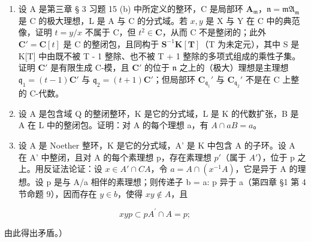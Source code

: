 \begin{enumerate}
\def\labelenumi{\arabic{enumi}.}
\setcounter{enumi}{19}
\item
  设 A 是第三章 § 3 习题 15 (b) 中所定义的整环，C 是局部环 \(\mathbf{A}_{\mathfrak{m}}\)，\(\mathfrak{n} = \mathfrak{mA}_{\mathfrak{m}}\) 是 C 的极大理想，L 是 A 与 C 的分式域。若 \(x, y\) 是 X 与 Y 在 C 中的典范像，证明 \(t = y / x\) 不属于 C，但 \(t^2 \in \mathbf{C}\)，从而 C 不是整闭的；此外 \(\mathbf{C}' = \mathbf{C}[t]\) 是 C 的整闭包，且同构于 \(\mathbf{S}^{-1}\mathbf{K}[\mathbf{T}]\)（T 为未定元），其中 S 是 K{[}T{]} 中由既不被 T - 1 整除、也不被 T + 1 整除的多项式组成的乘性子集。证明 \(\mathbf{C}'\) 是有限生成 C-模，且 \(\mathbf{C}'\) 的位于 \(\mathfrak{n}\) 之上的（极大）理想是主理想 \(\mathfrak{q}_1 = (t - 1)\mathbf{C}'\) 与 \(\mathfrak{q}_2 = (t + 1)\mathbf{C}'\)；但局部环 \(\mathbf{C}_{\mathfrak{q}_1}'\) 与 \(\mathbf{C}_{\mathfrak{q}_2}'\) 不是在 C 上整的 C-代数。
\item
  设 A 是包含域 Q 的整闭整环，K 是它的分式域，L 是 K 的代数扩张，B 是 A 在 L 中的整闭包。证明：对 A 的每个理想 a，有 \(A \cap aB = a\)。
\item
  设 A 是 Noether 整环，K 是它的分式域，A' 是 K 中包含 A 的子环。设 A 在 A' 中整闭，且对 A 的每个素理想 p，存在素理想 \(p'\)（属于 \(A'\)），位于 p 之上。用反证法论证：设 \(x \in A' \cap C A\)，令 \(a = A \cap (x^{-1} A)\)，它是异于 A 的理想。设 p 是与 A/a 相伴的素理想；则传递子 b = a: p 异于 a（第四章 §1 第 4 节命题 9），因而存在 \(y \in b\)，使得 \(xy \notin A\)，且
\end{enumerate}

\[
x y p \subset p A ^ {\prime} \cap A = p;
\]

由此得出矛盾。）

